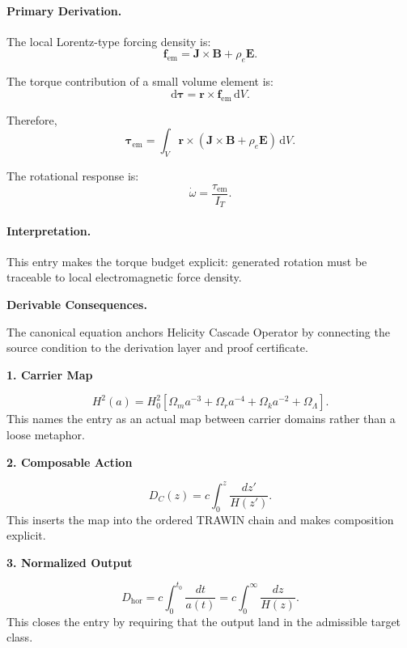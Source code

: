 \paragraph{Primary Derivation.}
The local Lorentz-type forcing density is:
\begin{equation}
\mathbf{f}_{\mathrm{em}}
=
\mathbf{J}\times\mathbf{B}
+
\rho_e\mathbf{E}.
\end{equation}

The torque contribution of a small volume element is:
\begin{equation}
\mathrm{d}\boldsymbol{\tau}
=
\mathbf{r}\times\mathbf{f}_{\mathrm{em}}\,\mathrm{d}V .
\end{equation}

Therefore,
\begin{equation}
\boldsymbol{\tau}_{\mathrm{em}}
=
\int_V
\mathbf{r}\times
\left(
\mathbf{J}\times\mathbf{B}
+
\rho_e\mathbf{E}
\right)
\,\mathrm{d}V .
\end{equation}

The rotational response is:
\begin{equation}
\boxed{
\dot{\omega}
=
\frac{\tau_{\mathrm{em}}}{I_T}.
}
\end{equation}

\paragraph{Interpretation.}
This entry makes the torque budget explicit: generated rotation must be traceable to local electromagnetic force density.

\par\vspace{0.35em}
\noindent\textbf{Derivable Consequences.}\quad
\begingroup
\footnotesize
\raggedright
The canonical equation anchors Helicity Cascade Operator by connecting the source condition to the derivation layer and proof certificate.
\par\endgroup

\noindent\textbf{1. Carrier Map}\par
\[
H^2(a)=H_0^2\left[\Omega_m a^{-3}+\Omega_r a^{-4}+\Omega_k a^{-2}+\Omega_\Lambda\right].
\]
\noindent This names the entry as an actual map between carrier domains rather than a loose metaphor.\par
\noindent\textbf{2. Composable Action}\par
\[
D_C(z)=c\int_0^{z}\frac{dz'}{H(z')}.
\]
\noindent This inserts the map into the ordered TRAWIN chain and makes composition explicit.\par
\noindent\textbf{3. Normalized Output}\par
\[
D_{\text{hor}}=c\int_{0}^{t_0}\frac{dt}{a(t)}=c\int_{0}^{\infty}\frac{dz}{H(z)}.
\]
\noindent This closes the entry by requiring that the output land in the admissible target class.\par

